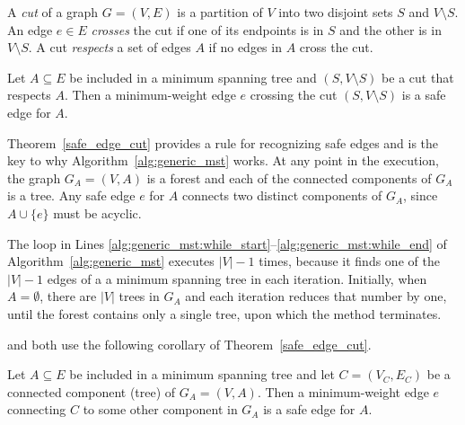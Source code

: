 A \emph{cut} of a graph \(G=(V,E)\) is a partition of \(V\) into two disjoint sets \(S\) and \(V\setminus S\).
An edge \(e\in E\) \emph{crosses} the cut if one of its endpoints is in \(S\) and the other is in \(V\setminus S\).
A cut \emph{respects} a set of edges \(A\) if no edges in \(A\) cross the cut. 
\begin{theorem}\label{safe_edge_cut}
Let \(A \subseteq E\) be included in a minimum spanning tree and 
\((S, V\setminus S)\) be a cut that respects \(A\).
Then a minimum-weight edge \(e\) crossing the cut \((S, V\setminus S)\) is a safe edge for \(A\).
\end{theorem}

Theorem~\ref{safe_edge_cut} provides a rule for recognizing safe edges and is the key to why Algorithm~\ref{alg:generic_mst} works.
At any point in the execution, the graph \(G_A=(V,A)\) is a forest and each of the connected components of \(G_A\) is a tree.
Any safe edge \(e\) for \(A\) connects two distinct components of \(G_A\), since \(A \cup \{e\}\) must be acyclic.

The loop in Lines \ref{alg:generic_mst:while_start}--\ref{alg:generic_mst:while_end} of Algorithm~\ref{alg:generic_mst} executes \(|V|-1\) times, because it finds one of the \(|V|-1\) edges of a a minimum spanning tree in each iteration.
Initially, when \(A=\emptyset\), there are \(|V|\) trees in \(G_A\) and each iteration reduces that number by one, until the forest contains only a single tree, upon which the method terminates.

 and  both use the following corollary of Theorem~\ref{safe_edge_cut}.
\begin{corollary}\label{cor:safe_edge_connected_component}
Let \(A \subseteq E\) be included in a minimum spanning tree and 
let \(C = (V_C, E_C)\) be a connected component (tree) of \(G_A = (V,A)\).
Then a minimum-weight edge \(e\) connecting \(C\) to some other component in \(G_A\) is a safe edge for \(A\).
\end{corollary}

